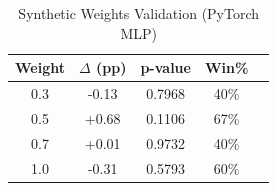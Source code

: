 \begin{table}[htbp]
\centering
\caption{Synthetic Weights Validation (PyTorch MLP)}
\label{tab:pytorch_weights}
\begin{tabular}{ccccc}
\toprule
Weight & $\Delta$ (pp) & p-value & Win\% \\
\midrule
0.3 & -0.13 & 0.7968 & 40\% \\
0.5 & +0.68 & 0.1106 & 67\% \\
0.7 & +0.01 & 0.9732 & 40\% \\
1.0 & -0.31 & 0.5793 & 60\% \\
\bottomrule
\end{tabular}
\end{table}